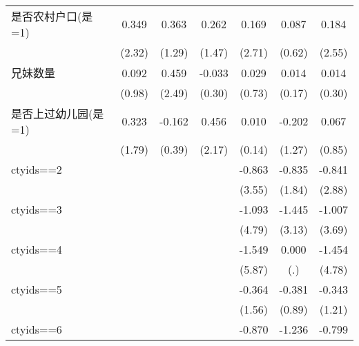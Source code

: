 \begin{table}[htbp]
\begin{center}
\begin{threeparttable}
\begin{tabular}{l*{6}{c}}
是否农村户口(是=1)&    0.349\sym{**} &    0.363         &    0.262         &    0.169\sym{***}&    0.087         &    0.184\sym{**} \\
                &   (2.32)         &   (1.29)         &   (1.47)         &   (2.71)         &   (0.62)         &   (2.55)         \\
兄妹数量        &    0.092         &    0.459\sym{**} &   -0.033         &    0.029         &    0.014         &    0.014         \\
                &   (0.98)         &   (2.49)         &   (0.30)         &   (0.73)         &   (0.17)         &   (0.30)         \\
是否上过幼儿园(是=1)&    0.323\sym{*}  &   -0.162         &    0.456\sym{**} &    0.010         &   -0.202         &    0.067         \\
                &   (1.79)         &   (0.39)         &   (2.17)         &   (0.14)         &   (1.27)         &   (0.85)         \\
ctyids==2       &                  &                  &                  &   -0.863\sym{***}&   -0.835\sym{*}  &   -0.841\sym{***}\\
                &                  &                  &                  &   (3.55)         &   (1.84)         &   (2.88)         \\
ctyids==3       &                  &                  &                  &   -1.093\sym{***}&   -1.445\sym{***}&   -1.007\sym{***}\\
                &                  &                  &                  &   (4.79)         &   (3.13)         &   (3.69)         \\
ctyids==4       &                  &                  &                  &   -1.549\sym{***}&    0.000         &   -1.454\sym{***}\\
                &                  &                  &                  &   (5.87)         &      (.)         &   (4.78)         \\
ctyids==5       &                  &                  &                  &   -0.364         &   -0.381         &   -0.343         \\
                &                  &                  &                  &   (1.56)         &   (0.89)         &   (1.21)         \\
ctyids==6       &                  &                  &                  &   -0.870\sym{***}&   -1.236\sym{**} &   -0.799\sym{***}\\

\end{tabular}
\end{threeparttable}
\end{center}
\end{table}
